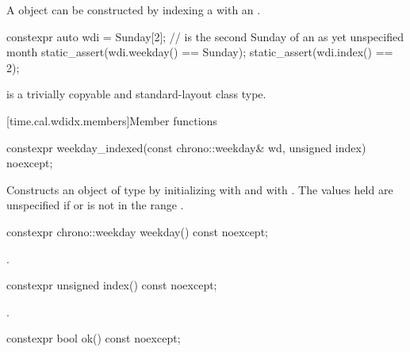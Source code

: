 \pnum
\begin{note}
A  object
can be constructed by indexing a 
with an .
\end{note}
\begin{example}
\begin{codeblock}
constexpr auto wdi = Sunday[2]; //  is the second Sunday of an as yet unspecified month
static_assert(wdi.weekday() == Sunday);
static_assert(wdi.index() == 2);
\end{codeblock}
\end{example}

\pnum
{} is a trivially copyable and standard-layout class type.

[time.cal.wdidx.members]{Member functions}

%
\begin{itemdecl}
constexpr weekday_indexed(const chrono::weekday& wd, unsigned index) noexcept;
\end{itemdecl}

\begin{itemdescr}
\pnum
\effects
Constructs an object of type  by
initializing  with  and  with .
The values held are unspecified if  or  is not in the range .
\end{itemdescr}

%
\begin{itemdecl}
constexpr chrono::weekday weekday() const noexcept;
\end{itemdecl}

\begin{itemdescr}
\pnum
\returns {}.
\end{itemdescr}

%
\begin{itemdecl}
constexpr unsigned index() const noexcept;
\end{itemdecl}

\begin{itemdescr}
\pnum
\returns {}.
\end{itemdescr}

%
\begin{itemdecl}
constexpr bool ok() const noexcept;
\end{itemdecl}

